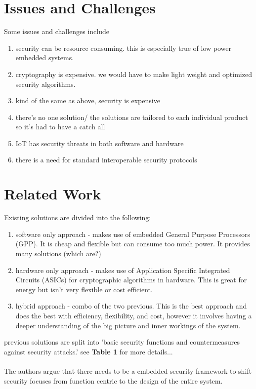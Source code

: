 \documentclass{article}
\begin{document}
\begin{enumerate}
\section*{Issues and Challenges}
Some issues and challenges include 
\begin{enumerate}
\item security can be resource consuming. this is especially true of low power embedded systems. 
\item cryptography is expensive. we would have to make light weight and optimized security algorithms. 
\item kind of the same as above, security is expensive
\item there's no one solution/ the solutions are tailored to each individual product so it's had to have a catch all
\item IoT has security threats in both software and hardware
\item there is a need for standard interoperable security protocols
\end{enumerate}

\section*{Related Work}
Existing solutions are divided into the following:
\begin{enumerate}
\item software only approach - makes use of embedded General Purpose Processors (GPP). It is cheap and flexible but can consume too much power. It provides many solutions (which are?)
\item hardware only approach - makes use of Application Specific Integrated Circuits (ASICs) for cryptographic algorithms in hardware. This is great for energy but isn't very flexible or cost efficient. 
\item hybrid approach - combo of the two previous. This is the best approach and does the best with efficiency, flexibility, and cost, however it involves having a deeper understanding of the big picture and inner workings of the system. 
\end{enumerate}

previous solutions are split into 'basic security functions and countermeasures against security attacks.' see \textbf{Table 1} for more details...
\\
\\ The authors argue that there needs to be a embedded security framework to shift security focuses from function centric to the design of the entire system. 


\end{enumerate}
\end{document}
